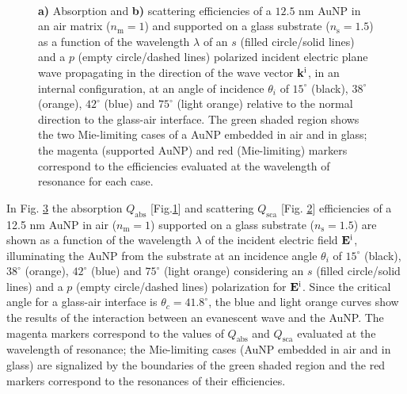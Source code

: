\begin{figure}[b!]
    \def\svgwidth{.95\textwidth}
    \centering
    \hspace*{-28.5em}%
    \vspace*{-1.25em}%
        \begin{subfigure}{.71\textwidth}\caption{ }\label{sfig:SuppObl:Eff:Abs}\end{subfigure}%
        \begin{subfigure}{.25\textwidth}\caption{ }\label{sfig:SuppObl:Eff:Sca}\end{subfigure} \\
    \vspace*{-.5em}
    \caption[Absorption and Scattering Efficiencies of a 12.5 nm AuNP on a Interface Illuminated in an internal configuration at oblique incidence]{\textbf{a)} Absorption and \textbf{b)} scattering efficiencies of a $12.5$ nm AuNP in an air matrix ($n_\text{m} = 1$) and supported on a glass substrate ($n_\text{s} = 1.5$) as a function of the wavelength $\lambda$ of an  $s$ (filled circle/solid lines) and a $p$ (empty circle/dashed lines) polarized incident electric plane wave propagating in the direction of the wave vector $\vb{k}^\text{i}$, in an internal configuration, at an angle of incidence $\theta_i$ of $15^\circ$ (black),  $38^\circ$ (orange),  $42^\circ$ (blue) and  $75^\circ$ (light orange) relative to the normal direction to the glass-air interface. The green shaded region shows the two Mie-limiting cases of a AuNP embedded in air and in glass; the magenta (supported AuNP) and red (Mie-limiting) markers correspond to the efficiencies evaluated at the wavelength of resonance for each case.}
\label{fig:SuppObl:Eff}
\end{figure}

In Fig. \ref{fig:SuppObl:Eff} the absorption $Q_\text{abs}$ [Fig.\ref{sfig:SuppObl:Eff:Abs}] and scattering $Q_\text{sca}$ [Fig. \ref{sfig:SuppObl:Eff:Sca}] efficiencies of a 12.5 nm AuNP in air ($n_\text{m} = 1$) supported on a glass substrate ($n_\text{s} = 1.5$) are shown as a function of the wavelength $\lambda$ of the incident electric field $\vb{E}^\text{i}$, illuminating the AuNP from the substrate at an incidence angle $\theta_i$ of $15^\circ$ (black),  $38^\circ$ (orange),   $42^\circ$ (blue) and  $75^\circ$ (light orange) considering an $s$ (filled circle/solid lines) and a $p$ (empty circle/dashed lines) polarization for $\vb{E}^\text{i}$. Since the critical angle for a glass-air interface is $\theta_c = 41.8^\circ$, the blue and light orange curves show the results of the interaction between an evanescent wave and the AuNP. The magenta markers correspond to the values of $Q_\text{abs}$ and $Q_\text{sca}$ evaluated at the wavelength of resonance; the Mie-limiting cases (AuNP embedded in air and in glass)  are signalized by the boundaries of the green shaded region  and the red markers correspond to the resonances of their efficiencies.

